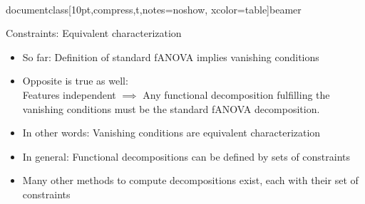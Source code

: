 \\documentclass[10pt,compress,t,notes=noshow, xcolor=table]{beamer}
\begin{document}
\begin{frame}{Constraints: Equivalent characterization}

    \begin{itemize}[<+->]
    
        \item So far: Definition of standard fANOVA implies vanishing conditions
        \item Opposite is true as well: \\
        Features independent $\implies$ Any functional decomposition fulfilling the vanishing conditions must be the standard fANOVA decomposition.
        \item In other words: Vanishing conditions are equivalent characterization
        \item In general: Functional decompositions can be defined by sets of constraints \\
        \item Many other methods to compute decompositions exist, each with their set of constraints
    
    \end{itemize}

    
\end{frame}


    
    
    
    
    

     



\endlecture
\end{document}
